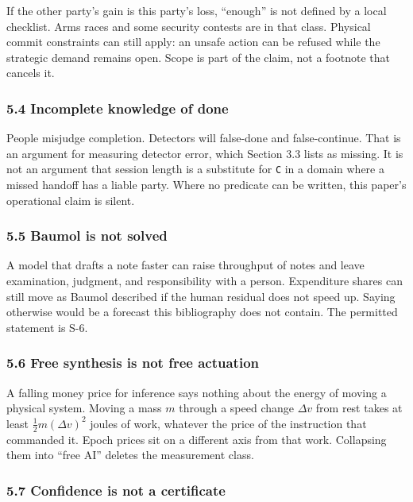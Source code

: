 \documentclass[
  10pt,
]{article}
\begin{document}
If the other party's gain is this party's loss, ``enough'' is not
defined by a local checklist. Arms races and some security contests are
in that class. Physical commit constraints can still apply: an unsafe
action can be refused while the strategic demand remains open. Scope is
part of the claim, not a footnote that cancels it.

\subsubsection{5.4 Incomplete knowledge of
done}\label{incomplete-knowledge-of-done}

People misjudge completion. Detectors will false-done and
false-continue. That is an argument for measuring detector error, which
Section 3.3 lists as missing. It is not an argument that session length
is a substitute for \texttt{C} in a domain where a missed handoff has a
liable party. Where no predicate can be written, this paper's
operational claim is silent.

\subsubsection{5.5 Baumol is not solved}\label{baumol-is-not-solved}

A model that drafts a note faster can raise throughput of notes and
leave examination, judgment, and responsibility with a person.
Expenditure shares can still move as Baumol described if the human
residual does not speed up. Saying otherwise would be a forecast this
bibliography does not contain. The permitted statement is S-6.

\subsubsection{5.6 Free synthesis is not free
actuation}\label{free-synthesis-is-not-free-actuation}

A falling money price for inference says nothing about the energy of
moving a physical system. Moving a mass \(m\) through a speed change
\(\Delta v\) from rest takes at least \(\tfrac12 m (\Delta v)^2\) joules
of work, whatever the price of the instruction that commanded it. Epoch
prices sit on a different axis from that work. Collapsing them into
``free AI'' deletes the measurement class.

\subsubsection{5.7 Confidence is not a
certificate}\label{confidence-is-not-a-certificate}
\end{document}
